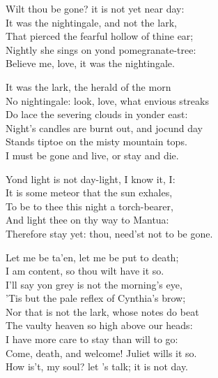  
\begin{speech}
Wilt thou be gone? it is not yet near day: \\
It was the nightingale, and not the lark, \\
That pierced the fearful hollow of thine ear; \\
Nightly she sings on yond pomegranate-tree: \\
Believe me, love, it was the nightingale. \\
\end{speech}
\begin{speech}
It was the lark, the herald of the morn \\
No nightingale: look, love, what envious streaks \\
Do lace the severing clouds in yonder east: \\
Night's candles are burnt out, and jocund day \\
Stands tiptoe on the misty mountain tops. \\
I must be gone and live, or stay and die. \\
\end{speech}
\begin{speech}
Yond light is not day-light, I know it, I: \\
It is some meteor that the sun exhales, \\
To be to thee this night a torch-bearer, \\
And light thee on thy way to Mantua: \\
Therefore stay yet: thou, need'st not to be gone. \\
\end{speech}
\begin{speech}
Let me be ta'en, let me be put to death; \\
I am content, so thou wilt have it so. \\
I'll say yon grey is not the morning's eye, \\
'Tis but the pale reflex of Cynthia's brow; \\
Nor that is not the lark, whose notes do beat \\
The vaulty heaven so high above our heads: \\
I have more care to stay than will to go: \\
Come, death, and welcome! Juliet wills it so. \\
How is't, my soul? let 's talk; it is not day. \\
\end{speech}

